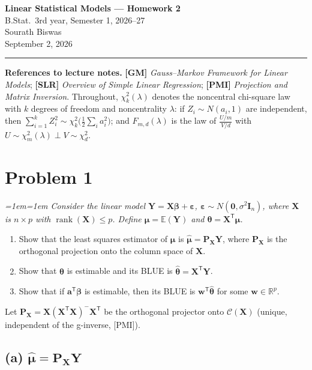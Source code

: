 \documentclass[11pt]{article}
\DeclareMathOperator{\rank}{rank}
\newcommand{\Cs}{\mathcal{C}}
\newcommand{\E}{\mathbb{E}}
\newcommand{\R}{\mathbb{R}}
\newcommand{\bX}{\mathbf{X}}
\newcommand{\bY}{\mathbf{Y}}
\newcommand{\bI}{\mathbf{I}}
\newcommand{\bP}{\mathbf{P}}
\newcommand{\bw}{\mathbf{w}}
\newcommand{\ba}{\mathbf{a}}
\newcommand{\bzero}{\mathbf{0}}
\newcommand{\bbeta}{\bm{\beta}}
\newcommand{\btheta}{\bm{\theta}}
\newcommand{\bmu}{\bm{\mu}}
\newcommand{\beps}{\bm{\varepsilon}}
\newcommand{\T}{^{\mathsf{T}}}
\newcommand{\bhat}[1]{\widehat{#1}}
\theoremstyle{remark}
\newenvironment{question}%
  {\smallskip\itshape\leftskip=1em\rightskip=1em\relax}%
  {\par\smallskip\noindent\hrulefill\par}
\begin{document}
\begin{center}
	{\large\bfseries Linear Statistical Models --- Homework 2}\\[3pt]
	{\normalsize B.Stat.\ 3rd year, Semester 1, 2026--27}\\[6pt]
	{\normalsize Sourath Biswas}\\[2pt]
	{\small September 2, 2026}
\end{center}

\hrule
\medskip

\noindent\textbf{References to lecture notes.}\;
\textbf{[GM]} \emph{Gauss--Markov Framework for Linear Models};\;
\textbf{[SLR]} \emph{Overview of Simple Linear Regression};\;
\textbf{[PMI]} \emph{Projection and Matrix Inversion}.\;
Throughout, $\chi^2_k(\lambda)$ denotes the noncentral chi-square law with $k$ degrees of freedom and
noncentrality $\lambda$: if $Z_i\sim N(a_i,1)$ are independent, then
$\sum_{i=1}^k Z_i^2\sim\chi^2_k\big(\tfrac12\sum_i a_i^2\big)$; and $F_{m,d}(\lambda)$ is the law of
$\frac{U/m}{V/d}$ with $U\sim\chi^2_m(\lambda)\perp V\sim\chi^2_d$.

\section*{Problem 1}

\begin{question}
Consider the linear model $\bY=\bX\bbeta+\beps$, $\beps\sim N(\bzero,\sigma^2\bI_n)$, where $\bX$ is
$n\times p$ with $\rank(\bX)\le p$. Define $\bmu=\E(\bY)$ and $\btheta=\bX\T\bmu$.
\begin{enumerate}[label=(\alph*),leftmargin=2.2em,itemsep=1pt]
\item Show that the least squares estimator of $\bmu$ is $\bhat{\bmu}=\bP_{\bX}\bY$, where $\bP_{\bX}$ is
the orthogonal projection onto the column space of $\bX$.
\item Show that $\btheta$ is estimable and its BLUE is $\bhat\btheta=\bX\T\bY$.
\item Show that if $\ba\T\bbeta$ is estimable, then its BLUE is $\bw\T\bhat\btheta$ for some $\bw\in\R^p$.
\end{enumerate}
\end{question}

Let $\bP_{\bX}=\bX(\bX\T\bX)^{-}\bX\T$ be the orthogonal projector onto $\Cs(\bX)$ (unique, independent of
the g-inverse, [PMI]).

\subsection*{(a) $\bhat{\bmu}=\bP_{\bX}\bY$}
\end{document}
